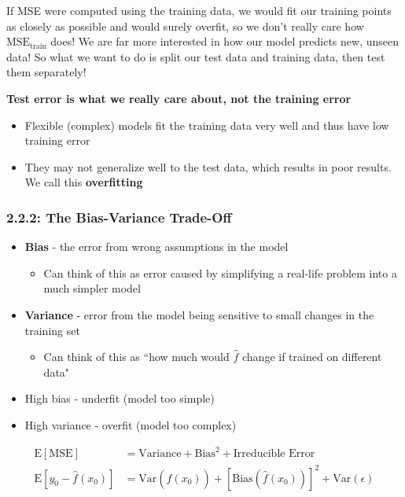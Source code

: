 If MSE were computed using the training data, we would fit our training points as closely as possible and would surely overfit, so we don't really care how \(\text{MSE}_{\text{train}}\) does! We are far more interested in how our model predicts new, unseen data! So what we want to do is split our test data and training data, then test them separately!

\textbf{Test error is what we really care about, not the training error}

\begin{itemize}
\tightlist
\item  Flexible (complex) models fit the training data very well and thus  have low training error
\item   They may not generalize well to the test data, which results in poor  results. We call this \textbf{overfitting}
\end{itemize}
\subsubsection*{2.2.2: The  Bias-Variance Trade-Off}
\begin{itemize}
\item  \textbf{Bias} - the error from wrong assumptions in the model

  \begin{itemize}
  \tightlist
  \item  Can think of this as error caused by simplifying a real-life problem  into a much simpler model
  \end{itemize}
\item  \textbf{Variance} - error from the model being sensitive to small changes in the training set

  \begin{itemize}
  \tightlist
  \item    Can think of this as ``how much would \(\hat f\) change if trained  on different data"
  \end{itemize}
\item  High bias - underfit (model too simple)
\item  High variance - overfit (model too complex)
\end{itemize}

\begin{align*}
\text{E}[\text{MSE}]&=\text{Variance}+ \text{Bias}^2 + \text{Irreducible Error}\\
\text{E}[y_0 - \hat{f}(x_0)]&=\text{Var}(\hat f(x_0))+ [\text{Bias}(\hat f(x_0))]^2 + \text{Var}(\epsilon)
\end{align*}

